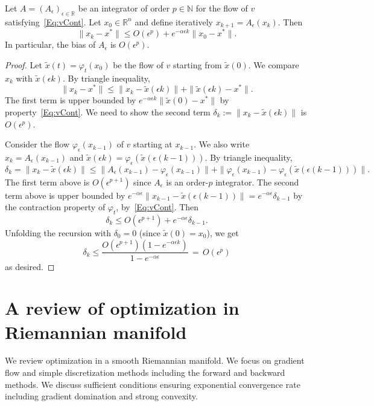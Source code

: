 \documentclass[final,12pt]{colt2018}
\newcommand{\R}{\mathbb{R}}
\newcommand{\bN}{\mathbb{N}}
\begin{document}
\begin{lemma}
Let $A = (A_\epsilon)_{\epsilon \in \R}$ be an integrator of order $p \in \bN$ for the flow of $v$ satisfying~\eqref{Eq:vCont}.
Let $x_0 \in \R^n$ and define iteratively $x_{k+1} = A_\epsilon(x_k)$.
Then
$$\|x_k-x^\ast\| \le O(\epsilon^p) + e^{-\alpha \epsilon k} \|x_0-x^\ast\|.$$
In particular, the bias of $A_\epsilon$ is $O(\epsilon^p)$.
\end{lemma}
\begin{proof}
Let $\tilde x(t) = \varphi_t(x_0)$ be the flow of $v$ starting from $\tilde x(0)$.
We compare $x_k$ with $\tilde x(\epsilon k)$.
By triangle inequality,
$$\|x_k-x^\ast\| \le \|x_k-\tilde x(\epsilon k)\| + \|\tilde x(\epsilon k)-x^\ast\|.$$
The first term is upper bounded by $e^{-\alpha \epsilon k} \|\tilde x(0) - x^\ast\|$ by property~\eqref{Eq:vCont}.
We need to show the second term $\delta_k := \|x_k - \tilde x(\epsilon k)\|$ is $O(\epsilon^p)$.

Consider the flow $\varphi_\epsilon(x_{k-1})$ of $v$ starting at $x_{k-1}$.
We also write $x_k = A_\epsilon(x_{k-1})$ and $\tilde x(\epsilon k) = \varphi_\epsilon(\tilde x(\epsilon (k-1)))$.
By triangle inequality,
$$\delta_k = \|x_k - \tilde x(\epsilon k)\| \le \|A_\epsilon(x_{k-1}) - \varphi_\epsilon(x_{k-1})\| + \|\varphi_\epsilon(x_{k-1}) - \varphi_\epsilon(\tilde x(\epsilon (k-1)))\|.$$
The first term above is $O(\epsilon^{p+1})$ since $A_\epsilon$ is an order-$p$ integrator.
The second term above is upper bounded by $e^{-\alpha \epsilon}\|x_{k-1} - \tilde x(\epsilon(k-1))\| = e^{-\alpha \epsilon} \delta_{k-1}$ by the contraction property of $\varphi_t$, by~\eqref{Eq:vCont}.
Then
$$\delta_k \le O(\epsilon^{p+1}) + e^{-\alpha \epsilon} \delta_{k-1}.$$
Unfolding the recursion with $\delta_0 = 0$ (since $\tilde x(0) = x_0$), we get
$$\delta_k \le \frac{O(\epsilon^{p+1})(1-e^{-\alpha \epsilon k})}{1-e^{-\alpha \epsilon}} \,=\, O(\epsilon^p)$$
as desired.
\end{proof}



\section{A review of optimization in Riemannian manifold}
\label{App:OptM}

We review optimization in a smooth Riemannian manifold.
We focus on gradient flow and simple discretization methods including the forward and backward methods.
We discuss sufficient conditions ensuring exponential convergence rate including gradient domination and strong convexity.
\end{document}
